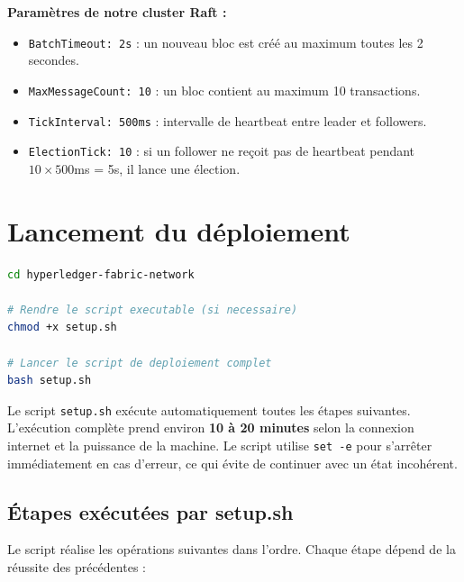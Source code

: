 \documentclass[12pt,a4paper,twoside]{report}
\begin{document}
\textbf{Paramètres de notre cluster Raft :}
\begin{itemize}
    \item \texttt{BatchTimeout: 2s} : un nouveau bloc est créé au maximum toutes les 2 secondes.
    \item \texttt{MaxMessageCount: 10} : un bloc contient au maximum 10 transactions.
    \item \texttt{TickInterval: 500ms} : intervalle de heartbeat entre leader et followers.
    \item \texttt{ElectionTick: 10} : si un follower ne reçoit pas de heartbeat pendant $10 \times 500$ms = 5s, il lance une élection.
\end{itemize}

\section{Lancement du déploiement}

\begin{lstlisting}[language=bash, caption=Déploiement du réseau Fabric]
cd hyperledger-fabric-network

# Rendre le script executable (si necessaire)
chmod +x setup.sh

# Lancer le script de deploiement complet
bash setup.sh
\end{lstlisting}

\begin{infobox}
Le script \texttt{setup.sh} exécute automatiquement toutes les étapes suivantes. L'exécution complète prend environ \textbf{10 à 20 minutes} selon la connexion internet et la puissance de la machine. Le script utilise \texttt{set -e} pour s'arrêter immédiatement en cas d'erreur, ce qui évite de continuer avec un état incohérent.
\end{infobox}

\subsection{Étapes exécutées par setup.sh}

Le script réalise les opérations suivantes dans l'ordre. Chaque étape dépend de la réussite des précédentes :
\end{document}
